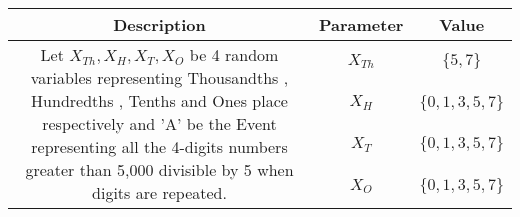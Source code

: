 
\providecommand{\pr}[1]{\ensuremath{\Pr\left(#1\right)}}


\begin{center}
\large \begin{tabular}{|c|c|c|}
     \hline
     Description & Parameter & Value  \\
     \hline 
     \multirow{4}{*}{\parbox{13cm}{Let $X_{Th} , X_H , X_T , X_O$ be 4 random variables representing Thousandths , Hundredths , Tenths and Ones place respectively and 'A' be the Event representing all the 4-digits numbers greater than 5,000 divisible by 5 when digits are repeated.}} & $X_{Th}$ &  $\{5,7\}$ \\
                          & $X_H$ &  $\{0,1,3,5,7\}$  \\
                          & $X_T$ &  $\{0,1,3,5,7\}$  \\
                          & $X_O$ &  $\{0,1,3,5,7\}$  \\
     \hline
 \end{tabular} 
 \end{center}
